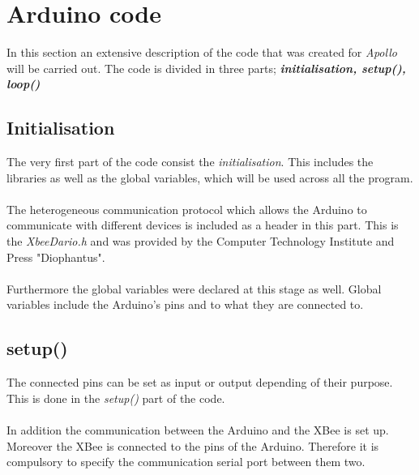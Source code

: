 \documentclass[12pt,a4paper]{report}
\begin{document}
\section{Arduino code}
In this section an extensive description of the code that was created for \emph{Apollo} will be carried out. The code is divided in three parts; \textit{\textbf{initialisation, setup(), loop()}}
%
\subsection{Initialisation}
The very first part of the code consist the \textit{initialisation}. This includes the libraries as well as the global variables, which will be used across all the program.\\
\ \\
The heterogeneous communication protocol which allows the Arduino to communicate with different devices is included as a header in this part. This is the \textit{XbeeDario.h} and was provided by the Computer Technology Institute and Press "Diophantus".\\
\ \\
Furthermore the global variables were declared at this stage as well. Global variables include the Arduino's pins and to what they are connected to. 
%
\subsection{setup()}
The connected pins can be set as input or output depending of their purpose. This is done in the \textit{setup()} part of the code.\\
\ \\
In addition the communication between the Arduino and the XBee is set up. Moreover the XBee is connected to the pins of the Arduino. Therefore it is compulsory to specify the communication serial port between them two.
%
\end{document}
